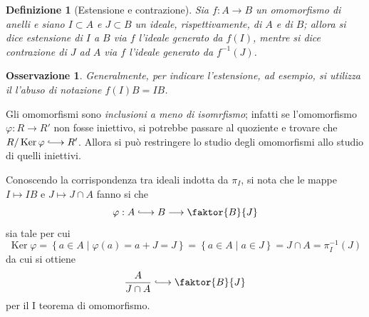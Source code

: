\documentclass[12pt]{scrartcl}
\theoremstyle{style}
\newtheorem{definizione}{Definizione}[section]
\newtheorem{osservazione}{Osservazione}[section]
\numberwithin{equation}{subsection}
\newcommand{\longhookrightarrow}{\lhook\joinrel\longrightarrow}
\begin{document}
\begin{definizione}
	[Estensione e contrazione]
	Sia $f: A\to B$ un omomorfismo di anelli e siano $I\subset A$ e $J \subset B$ un ideale, rispettivamente, di $A$ e di $B$; allora si dice \textit{estensione} di $I$ a $B$ via $f$ l'ideale generato da $f(I)$, mentre si dice \textit{contrazione} di $J$ ad $A$ via $f$ l'ideale generato da $f^{-1}(J)$.
\end{definizione}
\begin{osservazione}
Generalmente, per indicare l'estensione, ad esempio, si utilizza il l'abuso di notazione $f(I)B = IB$.
\end{osservazione}
\noindent Gli omomorfismi sono \textit{inclusioni a meno di isomrfismo}; infatti se l'omomorfismo $\varphi : R\longrightarrow R'$ non fosse iniettivo, si potrebbe passare al quoziente e trovare che $R / \operatorname{Ker} \varphi \longhookrightarrow R'$.
Allora si pu\`o restringere lo studio degli omomorfismi allo studio di quelli iniettivi. 

Conoscendo la corrispondenza tra ideali indotta da $\pi_I$, si nota che le mappe $I \longmapsto IB$ e $J\longmapsto J\cap A$ fanno si che 
\[
	\varphi  :A \longhookrightarrow B \longrightarrow \faktor{B}{J}
\] 
sia tale per cui
\[
\operatorname{Ker} \varphi = \left\{ a \in A  \mid \varphi (a) = a+J = J \right\} = \left\{ a \in A  \mid a \in J \right\} = J\cap A = \pi^{-1}_I(J)
\] 
da cui si ottiene 
\begin{equation}
	\frac{A}{J\cap A}\longhookrightarrow \faktor{B}{J}
\end{equation}
per il I teorema di omomorfismo.
\end{document}
